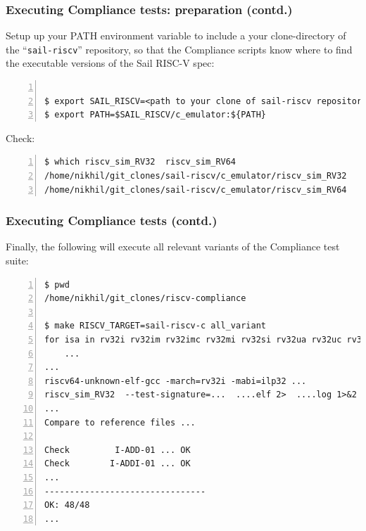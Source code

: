 \documentclass[aspectratio=169]{beamer}
\newcommand{\slidefont}{\scriptsize}
\begin{document}
\begin{frame}[fragile]
  \frametitle{Executing Compliance tests: preparation (contd.)}

  \slidefont

  Setup up your PATH environment variable to include a your
  clone-directory of the ``{\tt sail-riscv}'' repository, so that the
  Compliance scripts know where to find the executable versions of the
  Sail RISC-V spec:

  \vspace{1ex}

  \begin{Verbatim}[frame=single, numbers=left]

$ export SAIL_RISCV=<path to your clone of sail-riscv repository>/sail-riscv
$ export PATH=$SAIL_RISCV/c_emulator:${PATH}
  \end{Verbatim}

  Check:

  \vspace{1ex}

  \begin{Verbatim}[frame=single, numbers=left]
$ which riscv_sim_RV32  riscv_sim_RV64 
/home/nikhil/git_clones/sail-riscv/c_emulator/riscv_sim_RV32
/home/nikhil/git_clones/sail-riscv/c_emulator/riscv_sim_RV64
  \end{Verbatim}

\end{frame}


\begin{frame}[fragile]
  \frametitle{Executing Compliance tests (contd.)}

  \slidefont

  Finally, the following will execute all relevant variants of the Compliance test suite:

  \vspace{1ex}

  \begin{Verbatim}[frame=single, numbers=left, label = In your riscv-compliance repository clone]
$ pwd
/home/nikhil/git_clones/riscv-compliance

$ make RISCV_TARGET=sail-riscv-c all_variant
for isa in rv32i rv32im rv32imc rv32mi rv32si rv32ua rv32uc rv32ui rv64i rv64im; do \
    ...
...
riscv64-unknown-elf-gcc -march=rv32i -mabi=ilp32 ...
riscv_sim_RV32  --test-signature=...  ....elf 2>  ....log 1>&2
...
Compare to reference files ... 

Check         I-ADD-01 ... OK
Check        I-ADDI-01 ... OK
...
--------------------------------
OK: 48/48
...
  \end{Verbatim}

\end{frame}
\end{document}
